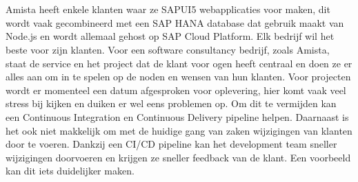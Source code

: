 %

\section{}
\label{sec:probleemstelling}

Amista heeft enkele klanten waar ze SAPUI5 webapplicaties voor maken, dit wordt vaak gecombineerd met een SAP HANA database dat gebruik maakt van Node.js en wordt allemaal gehost op SAP Cloud Platform.
Elk bedrijf wil het beste voor zijn klanten. Voor een software consultancy bedrijf, zoals Amista, staat de service en het project dat de klant voor ogen heeft centraal en doen ze er alles aan om in te spelen op de noden en wensen van hun klanten.
Voor projecten wordt er momenteel een datum afgesproken voor oplevering, hier komt vaak veel stress bij kijken en duiken er wel eens problemen op. Om dit te vermijden kan een Continuous Integration en Continuous Delivery pipeline helpen. Daarnaast is het ook niet makkelijk om met de huidige gang van zaken wijzigingen van klanten door te voeren. Dankzij een CI/CD pipeline kan het development team sneller wijzigingen doorvoeren en krijgen ze sneller feedback van de klant.
Een voorbeeld kan dit iets duidelijker maken.

